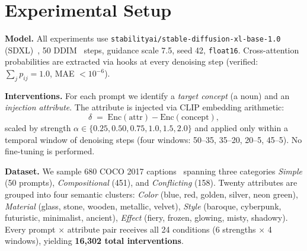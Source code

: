 \documentclass{article}
\begin{document}
\section{Experimental Setup}
\label{sec:setup}

\textbf{Model.}
All experiments use \texttt{stabilityai/stable-diffusion-xl-base-1.0}
(SDXL)~\citep{podell2023sdxl}, 50 DDIM~\citep{song2021ddim} steps,
guidance scale 7.5, seed 42, \texttt{float16}.  Cross-attention
probabilities are extracted via hooks at every denoising step
(verified: $\sum_j p_{ij} = 1.0$, MAE $< 10^{-6}$).

\textbf{Interventions.}
For each prompt we identify a \emph{target concept} (a noun) and
an \emph{injection attribute}.  The attribute is injected via CLIP
embedding arithmetic:
\[
  \delta \;=\; \mathrm{Enc}(\text{attr}) - \mathrm{Enc}(\text{concept}),
\]
scaled by strength $\alpha \in \{0.25, 0.50, 0.75, 1.0, 1.5, 2.0\}$
and applied only within a temporal window of denoising steps
(four windows: 50--35, 35--20, 20--5, 45--5).
No fine-tuning is performed.

\textbf{Dataset.}
We sample 680 COCO 2017 captions~\citep{lin2014coco} spanning three
categories \textit{Simple} (50 prompts), \textit{Compositional}
(451), and \textit{Conflicting} (158).  Twenty attributes are grouped
into four semantic clusters: \textit{Color} (blue, red, golden,
silver, neon green), \textit{Material} (glass, stone, wooden,
metallic, velvet), \textit{Style} (baroque, cyberpunk, futuristic,
minimalist, ancient), \textit{Effect} (fiery, frozen, glowing, misty,
shadowy).  Every prompt $\times$ attribute pair receives all 24
conditions (6 strengths $\times$ 4 windows), yielding \textbf{16,302
total interventions}.
\end{document}
